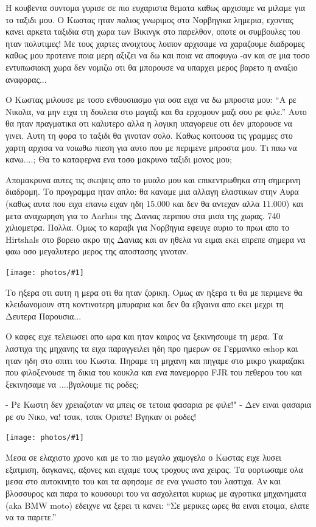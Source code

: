 \documentclass[11pt, letterpaper]{book}
\newcommand\photo[1]{\begin{center}\noindent\texttt{[image: photos/\#1]}\end{center}}
\begin{document}
Η κουβεντα συντομα γυρισε σε πιο ευχαριστα θεματα καθως αρχισαμε να μιλαμε για το ταξιδι μου. 
Ο Κωστας ηταν παλιος γνωριμος στα Νορβηγικα λημερια, εχοντας κανει αρκετα ταξιδια στη χωρα των Βικινγκ στο παρελθον, οποτε οι συμβουλες του ηταν πολυτιμες! Με τους χαρτες ανοιχτους λοιπον αρχισαμε να χαραζουμε διαδρομες καθως μου προτεινε ποια μερη αξιζει να δω και ποια να αποφυγω -αν και σε μια τοσο εντυπωσιακη χωρα δεν νομιζω οτι θα μπορουσε να υπαρχει μερος βαρετο η αναξιο αναφορας...

Ο Κωστας μιλουσε με τοσο ενθουσιασμο για οσα ειχα να δω μπροστα μου: ``Α ρε Νικολα, να μην ειχα τη δουλεια στο μαγαζι και θα ερχομουν μαζι σου ρε φιλε.''
Αυτο θα ηταν πραγματικα οτι καλυτερο αλλα η λογικη υπαγορευε οτι δεν μπορουσε να γινει. Αυτη τη φορα το ταξιδι θα γινοταν σολο. 
Καθως κοιτουσα τις γραμμες στο χαρτη αρχισα να νοιωθω πιεση για αυτο που με περιμενε μπροστα μου. Τι παω να κανω....; Θα το καταφερνα ενα τοσο μακρυνο ταξιδι μονος μου; 

Απομακρυνα αυτες τις σκεψεις απο το μυαλο μου και επικεντρωθηκα στη σημερινη διαδρομη. Το προγραμμα ηταν απλο: θα καναμε μια αλλαγη ελαστικων στην Αυρα (καθως αυτα που ειχα επανω ειχαν ηδη 15.000 και δεν θα αντεχαν αλλα 11.000) και μετα αναχωρηση για το Aarhus της Δανιας περιπου στα μισα της χωρας. 
740 χιλιομετρα. 
Πολλα. 
Ομως το καραβι για Νορβηγια εφευγε αυριο το πρωι απο το Hirtshals στο βορειο ακρο της Δανιας και αν ηθελα να ειμαι εκει επρεπε σημερα να φαω οσο μεγαλυτερο μερος της αποστασης γινοταν.

\photo{126.jpg}

Το ηξερα οτι αυτη η μερα οτι θα ηταν ζορικη. Ομως αν ηξερα τι θα με περιμενε θα κλειδωνομουν στη κοντινοτερη μπυραρια και δεν θα εβγαινα απο εκει μεχρι τη Δευτερα Παρουσια... 

Ο καφες ειχε τελειωσει απο ωρα και ηταν καιρος να ξεκινησουμε τη μερα.
Τα λαστιχα της μηχανης τα ειχα παραγγειλει ηδη προ ημερων σε Γερμανικο eshop και ηταν ηδη στο σπιτι του Κωστα. Πηραμε τη μηχανη και πηγαμε στο μικρο γκαραζακι που φιλοξενουσε τη δικια του κουκλα και ενα πανεμορφο FJR του πεθερου του και ξεκινησαμε να ....βγαλουμε τις ροδες; 

- Ρε Κωστη δεν χρειαζοταν να μπεις σε τετοια φασαρια ρε φιλε!"
- Δεν ειναι φασαρια ρε συ Νικο, να! {τσακ, τσακ} Οριστε! Βγηκαν οι ροδες!

\photo{127.jpg}

Μεσα σε ελαχιστο χρονο και με το πιο μεγαλο χαμογελο ο Κωστας ειχε λυσει εξατμιση, δαγκανες, αξονες και ειχαμε τους τροχους ανα χειρας. Τα φορτωσαμε ολα μεσα στο αυτοκινητο του και τα αφησαμε σε ενα γνωστο του λαστιχα. Aν και βλοσσυρος και παρα το κουσουρι του να ασχολειται κυριως με αγροτικα μηχανηματα (aka BMW moto) εδειχνε να ξερει τι κανει: ``Σε μερικες ωρες θα ειναι ετοιμα, ελατε να τα παρετε.''
\end{document}
